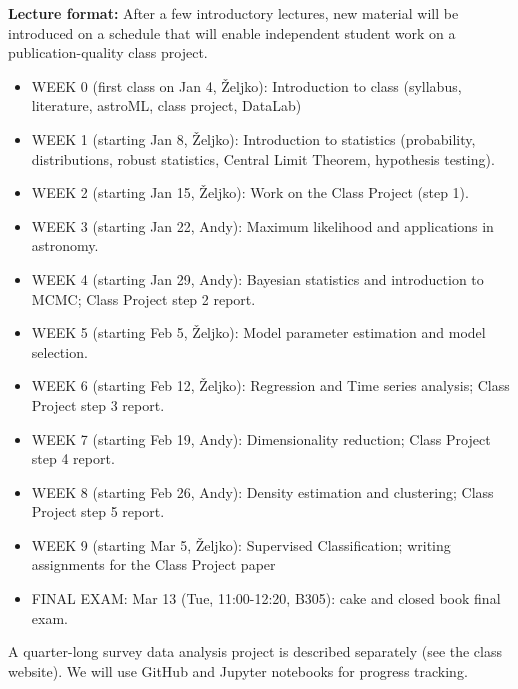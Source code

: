 \documentclass[10pt]{article}
\begin{document}
\vskip 0.2in
{\bf Lecture format:}
After a few introductory lectures, new material will be introduced on a schedule that 
will enable independent student work on a publication-quality class project. 

\newpage 
\begin{itemize}

\item WEEK 0 (first class on Jan 4, \v{Zeljko}): Introduction to class (syllabus, literature, astroML, class project, DataLab) 

\item WEEK 1 (starting Jan 8, \v{Zeljko}): Introduction to statistics (probability, distributions, 
                              robust statistics, Central Limit Theorem, hypothesis testing).

\item WEEK  2 (starting Jan 15, \v{Zeljko}): Work on the Class Project  (step 1). 

\item WEEK  3 (starting Jan 22, Andy): Maximum likelihood and applications in astronomy.

\item WEEK  4 (starting Jan 29, Andy): Bayesian statistics and introduction to MCMC; Class Project step 2 report.

\item WEEK  5 (starting Feb 5, \v{Zeljko}): Model parameter estimation and model selection.

\item WEEK  6 (starting Feb 12, \v{Zeljko}): Regression and Time series analysis; Class Project step 3 report. 

\item WEEK  7 (starting Feb 19, Andy): Dimensionality reduction; Class Project step 4 report. 

\item WEEK  8 (starting Feb 26, Andy): Density estimation and clustering; Class Project step 5 report. 

\item WEEK  9 (starting Mar 5, \v{Zeljko}): Supervised Classification; writing assignments for the Class Project paper 

\item FINAL EXAM: Mar 13 (Tue, 11:00-12:20, B305): cake and closed book final exam.

\end{itemize}

\vskip 0.2in


A quarter-long survey data analysis project is described separately (see the class website). 
We will use GitHub and Jupyter notebooks for progress tracking. 
\end{document}
